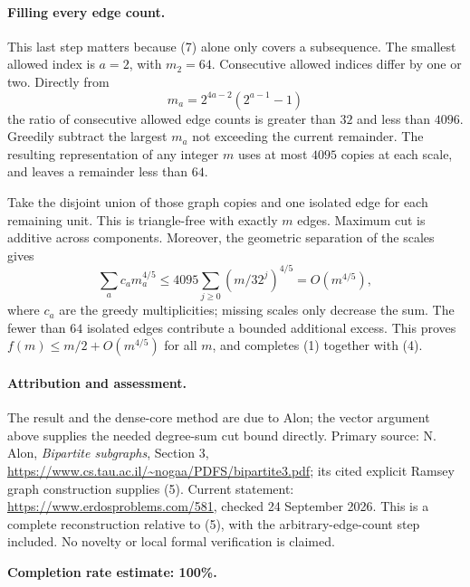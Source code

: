 \paragraph{Filling every edge count.}
This last step matters because (7) alone only covers a subsequence. The smallest allowed index is \(a=2\), with \(m_2=64\). Consecutive allowed indices differ by one or two. Directly from
\[
 m_a=2^{4a-2}(2^{a-1}-1)
\]
the ratio of consecutive allowed edge counts is greater than \(32\) and less than \(4096\). Greedily subtract the largest \(m_a\) not exceeding the current remainder. The resulting representation of any integer \(m\) uses at most \(4095\) copies at each scale, and leaves a remainder less than \(64\).

Take the disjoint union of those graph copies and one isolated edge for each remaining unit. This is triangle-free with exactly \(m\) edges. Maximum cut is additive across components. Moreover, the geometric separation of the scales gives
\[
 \sum_a c_a m_a^{4/5}
 \leq4095\sum_{j\geq0}(m/32^j)^{4/5}=O(m^{4/5}),
\]
where \(c_a\) are the greedy multiplicities; missing scales only decrease the sum. The fewer than \(64\) isolated edges contribute a bounded additional excess. This proves \(f(m)\leq m/2+O(m^{4/5})\) for all \(m\), and completes (1) together with (4).

\paragraph{Attribution and assessment.}
The result and the dense-core method are due to Alon; the vector argument above supplies the needed degree-sum cut bound directly. Primary source: N. Alon, \emph{Bipartite subgraphs}, Section 3, \url{https://www.cs.tau.ac.il/~nogaa/PDFS/bipartite3.pdf}; its cited explicit Ramsey graph construction supplies (5). Current statement: \url{https://www.erdosproblems.com/581}, checked 24 September 2026. This is a complete reconstruction relative to (5), with the arbitrary-edge-count step included. No novelty or local formal verification is claimed.

\textbf{Completion rate estimate: 100\%.}
